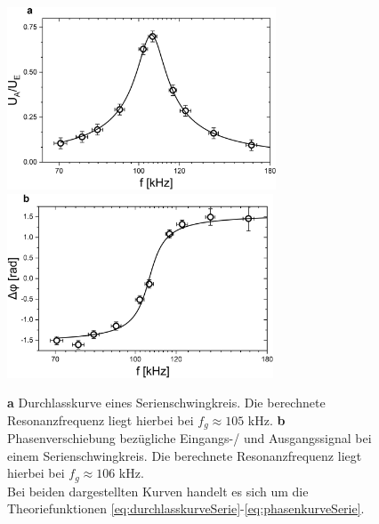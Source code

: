\documentclass[a4paper,usenatbib]{aspdoc}
\begin{document}
            \begin{figure}
                \centering
                \includegraphics[width=80mm]{graphs/SerieDurch1.png}
                \includegraphics[width=79mm]{graphs/SeriePhase1.png}
                \caption{
                    \textbf{a} Durchlasskurve eines Serienschwingkreis. Die berechnete Resonanzfrequenz liegt hierbei bei $f_g \approx 105$ kHz.
                    \textbf{b} Phasenverschiebung bezügliche Eingangs-/ und Ausgangssignal bei einem Serienschwingkreis. Die berechnete Resonanzfrequenz liegt hierbei bei $f_g \approx 106 $ kHz.\\
                    Bei beiden dargestellten Kurven handelt es sich um die Theoriefunktionen \ref{eq:durchlasskurveSerie}-\ref{eq:phasenkurveSerie}.
                }
                \label{fig:serieKurve}
            \end{figure}
            
\end{document}
